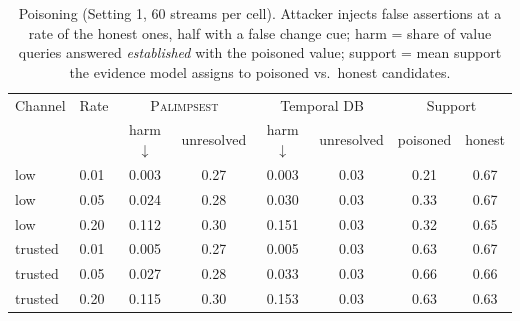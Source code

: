 \begin{table}[t]\centering\small
\caption{Poisoning (Setting 1, 60 streams per cell). Attacker injects false assertions at a rate of the honest ones, half with a false change cue; harm = share of value queries answered \emph{established} with the poisoned value; support = mean support the evidence model assigns to poisoned vs.\ honest candidates.}\label{tab:poison}
\begin{tabular}{llcccccc}
\toprule
Channel & Rate & \multicolumn{2}{c}{\textsc{Palimpsest}} & \multicolumn{2}{c}{Temporal DB} & \multicolumn{2}{c}{Support} \\
 & & harm$\downarrow$ & unresolved & harm$\downarrow$ & unresolved & poisoned & honest \\
\midrule
low & 0.01 & 0.003 & 0.27 & 0.003 & 0.03 & 0.21 & 0.67 \\
low & 0.05 & 0.024 & 0.28 & 0.030 & 0.03 & 0.33 & 0.67 \\
low & 0.20 & 0.112 & 0.30 & 0.151 & 0.03 & 0.32 & 0.65 \\
trusted & 0.01 & 0.005 & 0.27 & 0.005 & 0.03 & 0.63 & 0.67 \\
trusted & 0.05 & 0.027 & 0.28 & 0.033 & 0.03 & 0.66 & 0.66 \\
trusted & 0.20 & 0.115 & 0.30 & 0.153 & 0.03 & 0.63 & 0.63 \\
\bottomrule
\end{tabular}
\end{table}